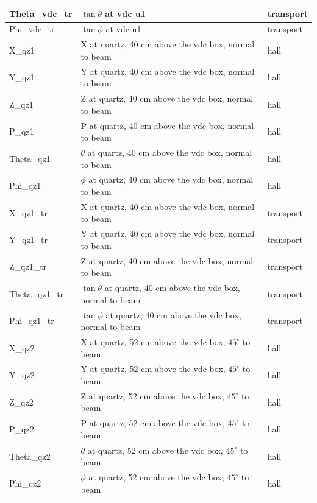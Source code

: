 \documentclass[11pt]{amsart}
\begin{document}
\begin{longtable}{| l | l | l |}
\hline
Theta\_vdc\_tr       & $\tan{\theta}$ at vdc u1 & transport \\
\hline
Phi\_vdc\_tr         & $\tan{\phi}$ at vdc u1 & transport \\
\hline
\hline
X\_qz1              & X at quartz, 40 cm above the vdc box, normal to beam  & hall \\
\hline
Y\_qz1              & Y at quartz, 40 cm above the vdc box, normal to beam  & hall \\
\hline
Z\_qz1              & Z at quartz, 40 cm above the vdc box, normal to beam  & hall \\
\hline
P\_qz1              & P at quartz, 40 cm above the vdc box, normal to beam  & hall \\
\hline
Theta\_qz1          & $\theta$ at quartz, 40 cm above the vdc box, normal to beam  & hall \\
\hline
Phi\_qz1            & $\phi$ at quartz, 40 cm above the vdc box, normal to beam  & hall \\
\hline
X\_qz1\_tr           & X at quartz, 40 cm above the vdc box, normal to beam  & transport \\
\hline
Y\_qz1\_tr           & Y at quartz, 40 cm above the vdc box, normal to beam  & transport \\
\hline
Z\_qz1\_tr           & Z at quartz, 40 cm above the vdc box, normal to beam  & transport \\
\hline
Theta\_qz1\_tr       & $\tan{\theta}$ at quartz, 40 cm above the vdc box, normal to beam  & transport \\
\hline
Phi\_qz1\_tr         & $\tan{\phi}$ at quartz, 40 cm above the vdc box, normal to beam  & transport \\
\hline
\hline
X\_qz2              & X at quartz, 52 cm above the vdc box, $45^\circ$ to beam  & hall \\
\hline
Y\_qz2              & Y at quartz, 52 cm above the vdc box, $45^\circ$ to beam  & hall \\
\hline
Z\_qz2              & Z at quartz, 52 cm above the vdc box, $45^\circ$ to beam  & hall \\
\hline
P\_qz2              & P at quartz, 52 cm above the vdc box, $45^\circ$ to beam & hall \\
\hline
Theta\_qz2          & $\theta$ at quartz, 52 cm above the vdc box, $45^\circ$ to beam  & hall \\
\hline
Phi\_qz2            & $\phi$ at quartz, 52 cm above the vdc box, $45^\circ$ to beam  & hall \\
\hline

\end{longtable}
\end{document}

